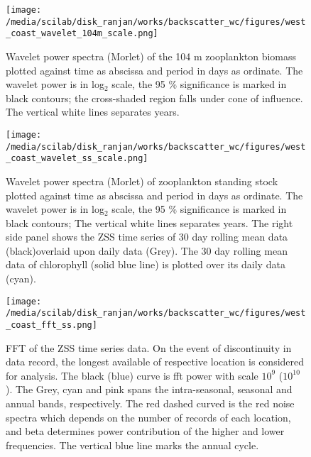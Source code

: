 \documentclass{article}
\begin{document}
\begin{figure}[htbp]
	\centering
	\texttt{[image: /media/scilab/disk\_ranjan/works/backscatter\_wc/figures/west\_coast\_wavelet\_104m\_scale.png]} 
	\captionsetup{justification=justified,font=footnotesize,skip=0.05\baselineskip,width=\textwidth}
	\caption{Wavelet power spectra (Morlet) of the 104 m zooplankton biomass plotted against time as abscissa and period in days as ordinate. The wavelet power is in log$_2$ scale, the 95 \% significance is marked in black contours; the cross-shaded region falls under cone of influence. The vertical white lines separates years.}
	\label{fig:fig8}
\end{figure}

\begin{figure}[htbp]
	\centering
	\texttt{[image: /media/scilab/disk\_ranjan/works/backscatter\_wc/figures/west\_coast\_wavelet\_ss\_scale.png]} 
	\captionsetup{justification=justified,font=footnotesize,skip=0.05\baselineskip,width=\textwidth}
	\caption{Wavelet power spectra (Morlet) of zooplankton standing stock plotted against time as abscissa and period in days as ordinate. The wavelet power is in log$_2$ scale, the 95 \% significance is marked in black contours; The vertical white lines separates years. The right side panel shows the ZSS time series of 30 day rolling mean data (black)overlaid upon daily data (Grey). The 30 day rolling mean data of chlorophyll (solid blue line) is plotted over its daily data (cyan).}
	\label{fig:fig9}
\end{figure}

\begin{figure}[htbp]
	\centering
	\texttt{[image: /media/scilab/disk\_ranjan/works/backscatter\_wc/figures/west\_coast\_fft\_ss.png]} 
	\captionsetup{justification=justified,font=footnotesize,skip=0.05\baselineskip,width=\textwidth}
	\caption{FFT of the ZSS time series data. On the event of discontinuity in data record, the longest available of respective location is considered for analysis. The black (blue) curve is fft power with scale $10^{9}$  ($10^{10}$). The Grey, cyan and pink spans the intra-seasonal, seasonal and annual bands, respectively. The red dashed curved is the red noise spectra which depends on the number of records of each location, and beta determines power contribution of the higher and lower frequencies. The vertical blue line marks the annual cycle.}
	\label{fig:fig10}
\end{figure}
\end{document}

